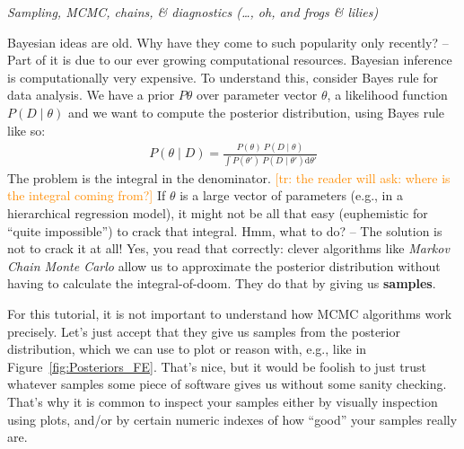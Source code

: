 \documentclass[nobib]{tufte-handout}
\newcommand{\tr}[1]{\textcolor{DarkOrange}{[tr: #1]}}
\begin{document}
\begin{InfoBox}[]
\centering
\colorbox{mygray}{\centering
  \begin{minipage}{1.5\textwidth}

    \emph{Sampling, MCMC, chains, \& diagnostics (\dots, oh, and frogs \& lilies)}
    \medskip

    Bayesian ideas are old. Why have they come to such popularity only recently? -- 
    Part of it is due to our ever growing computational resources. Bayesian inference is computationally very expensive. To understand this,
    consider Bayes rule for data analysis. We have a prior $P{\theta}$ over parameter vector
    $\theta$, a likelihood function $P(D\mid\theta)$ and we want to compute the posterior
    distribution, using Bayes rule like so:
    \begin{eqnarray*}
      P(\theta \mid D) = \frac{P(\theta) \ P(D \mid \theta)}{ \int P(\theta') \ P(D \mid
      \theta') \textrm{d}\theta'}
    \end{eqnarray*}
    The problem is the integral in the denominator.
    \tr{the reader will ask: where is the integral coming from?}
    If $\theta$ is a large vector of parameters
    (e.g., in a hierarchical regression model), it might not be all that easy (euphemistic for
    ``quite impossible'') to crack that integral. Hmm, what to do? -- The solution is not to
    crack it at all! Yes, you read that correctly: clever algorithms like \emph{Markov Chain
      Monte Carlo} allow us to approximate the posterior distribution without having to
    calculate the integral-of-doom. They do that by giving us \textbf{samples}.

    For this tutorial, it is not important to understand how MCMC algorithms work precisely.
    Let's just accept that they give us samples from the posterior distribution, which we can
    use to plot or reason with, e.g., like in Figure~\ref{fig:Posteriors_FE}. That's nice, but
    it would be foolish to just trust whatever samples some piece of software gives us without
    some sanity checking. That's why it is common to inspect your samples either by visually inspection using plots, and/or by certain numeric indexes of  how ``good'' your samples really are.
    

\end{minipage}}
\end{InfoBox}
\end{document}
